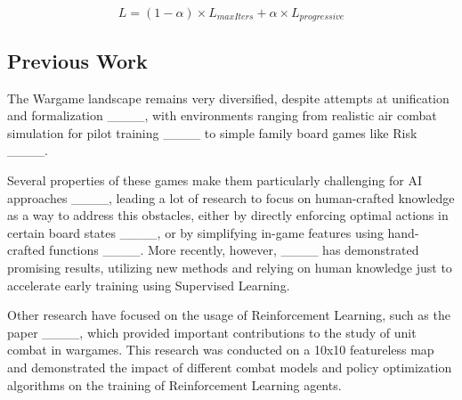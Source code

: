 \begin{equation}\label{eq:progressive_loss}
L = (1 - \alpha) \times L_{maxIters} + \alpha \times L_{progressive}
\end{equation}



\subsection{Previous Work}

The Wargame landscape remains very diversified, despite attempts at unification and formalization ____, with environments ranging from realistic air combat simulation for pilot training ____ to simple family board games like Risk ____.



Several properties of these games make them particularly challenging for AI approaches ____, leading a lot of research to focus on human-crafted knowledge as a way to address this obstacles, either by directly enforcing optimal actions in certain board states ____, or by simplifying in-game features using hand-crafted functions ____. More recently, however, ____ has demonstrated promising results, utilizing new methods and relying on human knowledge just to accelerate early training using Supervised Learning.

Other research have focused on the usage of Reinforcement Learning, such as the paper ____, which provided important contributions to the study of unit combat in wargames. This research was conducted on a 10x10 featureless map and demonstrated the impact of different combat models and policy optimization algorithms on the training of Reinforcement Learning agents.




